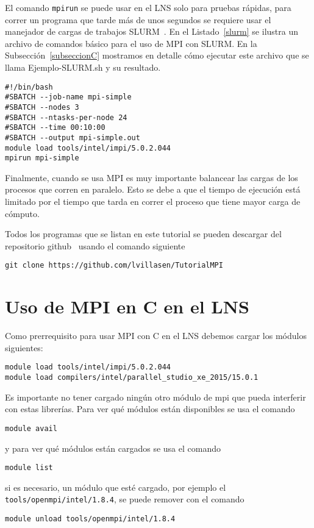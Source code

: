 \documentclass[letter]{jpconf}
\begin{document}
El comando  \texttt{mpirun} se puede usar en el LNS solo para pruebas r\'apidas, para correr un programa que tarde m\'as de unos segundos se requiere usar el manejador de cargas de trabajos SLURM~\cite{slurm,slurm1}. En el Listado~\ref{slurm}  se ilustra un archivo de comandos b\'asico para el uso de MPI con SLURM. 
En la Subsecci\'on~\ref{subseccionC} mostramos en detalle c\'omo ejecutar este archivo que se llama Ejemplo-SLURM.sh y su resultado.

\begin{lstlisting}[float,floatplacement=H,label=slurm,caption=Ejemplo de un archivo de comandos b\'asico para usar MPI con SLURM.]
#!/bin/bash
#SBATCH --job-name mpi-simple
#SBATCH --nodes 3
#SBATCH --ntasks-per-node 24
#SBATCH --time 00:10:00
#SBATCH --output mpi-simple.out
module load tools/intel/impi/5.0.2.044
mpirun mpi-simple
\end{lstlisting}

Finalmente, cuando se usa MPI es muy importante balancear las cargas de los procesos que corren en paralelo. Esto se debe a que el tiempo de ejecuci\'on est\'a limitado por el tiempo que tarda en correr el proceso que tiene mayor carga de c\'omputo.

Todos los programas que se listan en este tutorial se pueden descargar del repositorio github~\cite{github} usando el comando siguiente
\color{blue}
\begin{verbatim}
git clone https://github.com/lvillasen/TutorialMPI
\end{verbatim}
\color{black}










\section{Uso de MPI en C en el LNS}

Como prerrequisito para usar MPI con C en el LNS debemos cargar los m\'odulos siguientes:
\color{blue}
\begin{verbatim}
module load tools/intel/impi/5.0.2.044
module load compilers/intel/parallel_studio_xe_2015/15.0.1
\end{verbatim}
\color{black}
Es importante no tener cargado ning\'un otro m\'odulo de mpi que pueda interferir con estas librer\'ias. Para ver qu\'e m\'odulos est\'an disponibles se usa el comando
\color{blue}
\begin{verbatim}
module avail
\end{verbatim}
\color{black}
y para ver qu\'e m\'odulos est\'an cargados se usa el comando
\color{blue}
\begin{verbatim}
module list
\end{verbatim}
\color{black}
si es necesario, un m\'odulo que est\'e cargado, por ejemplo el  \texttt{tools/openmpi/intel/1.8.4}, se puede remover con el comando
\color{blue}
\begin{verbatim}
module unload tools/openmpi/intel/1.8.4
\end{verbatim}
\color{black}
\end{document}
